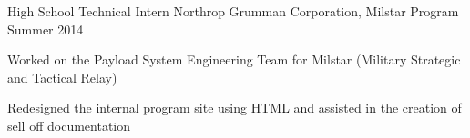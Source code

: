\begin{cventries}
  \cventry
    {High School Technical Intern} %
    {Northrop Grumman Corporation, Milstar Program} %
    {Summer 2014} %
    {} %
    {
      \begin{cvitems} %
        \item {Worked on the Payload System Engineering Team for Milstar (Military Strategic and Tactical Relay)}
        \item {Redesigned the internal program site using HTML and assisted in the creation of sell off documentation}
      \end{cvitems}
    }

\end{cventries}
